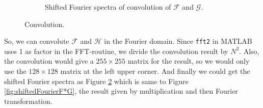 \documentclass[11pt,a4paper]{article}
\begin{document}
\begin{itemize}
\begin{figure}[!ht]
\begin{subfigure}[t]{.32\linewidth}
		\caption{\scriptsize Shifted Fourier spectra of convolution of $\mathcal{F}$ and $\mathcal{G}$.}
		\label{fig:shiftedConvolutionF*G}
		\end{subfigure}
		\caption{Convolution.}
	\end{figure}
	\par So, we can convolute $\mathcal{F}$ and $\mathcal{H}$ in the Fourier domain. Since \texttt{fft2} in MATLAB uses 1 as factor in the FFT-routine, we divide the convolution result by $N^{2}$. Also, the convolution would give a $255\times 255$ matrix for the result, so we would only use the $128\times 128$ matrix at the left upper corner. And finally we could get the shifted Fourier spectra as Figure \ref{fig:shiftedConvolutionF*G} which is same to Figure \ref{fig:shiftedFourierF*G}, the result given by multiplication and then Fourier transformation.
\end{itemize}
\end{document}

